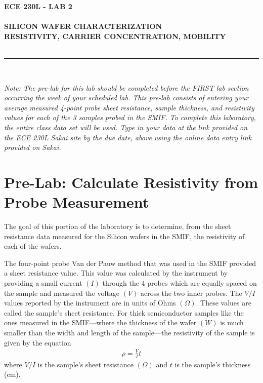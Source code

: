 \documentclass[12pt]{../manual}
\begin{document}
\begin{center}
\textbf{\huge ECE 230L - LAB 2}\\~\\
\textbf{\large SILICON WAFER CHARACTERIZATION \\
RESISTIVITY, CARRIER CONCENTRATION, MOBILITY}\\~\\
\rule{6.5in}{0.5mm}\\
\end{center}

\textit{Note: The pre-lab for this lab should be completed before the FIRST lab section occurring the week of your scheduled lab.  This pre-lab consists of entering your average measured 4-point probe sheet resistance, sample thickness, and resistivity values for each of the 3 samples probed in the SMIF.  To complete this laboratory, the entire class data set will be used.  Type in your data at the link provided on the ECE 230L Sakai site by the due date, above using the online data entry link provided on Sakai.}

\tableofcontents

\newpage
%
\section*{Pre-Lab: Calculate Resistivity from Probe Measurement}

The goal of this portion of the laboratory is to determine, from the sheet resistance data measured for the Silicon wafers in the SMIF, the resistivity of each of the wafers.

The four-point probe Van der Pauw method that was used in the SMIF provided a sheet resistance value.  This value was calculated by the instrument by providing a small current $(I)$ through the 4 probes which are equally spaced on the sample and measured the voltage $(V)$ across the two inner probes.  The $V/I$ values reported by the instrument are in units of Ohms $(\Omega)$.  These values are called the sample's sheet resistance.  For thick semiconductor samples like the ones measured in the SMIF---where the thickness of the wafer $(W)$ is much smaller than the width and length of the sample---the resistivity of the sample is given by the equation
\begin{align}
\rho = \frac{V}{I} t
\end{align}
where $V/I$ is the sample's sheet resistance $(\Omega)$ and $t$ is the sample's thickness (cm).
\end{document}
